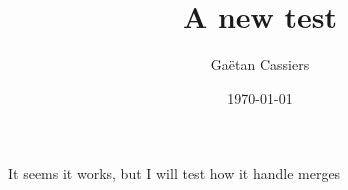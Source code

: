\documentclass[english,frenchb, 10pt, oneside, headings=normal]{scrartcl}
\begin{document}
\titlehead{}
\subject{}
\title{A new test}
\subtitle{}
\author{Gaëtan Cassiers}
\date{\today}
\publishers{}

\maketitle

It seems it works, but I will test how it handle merges
\end{document}
